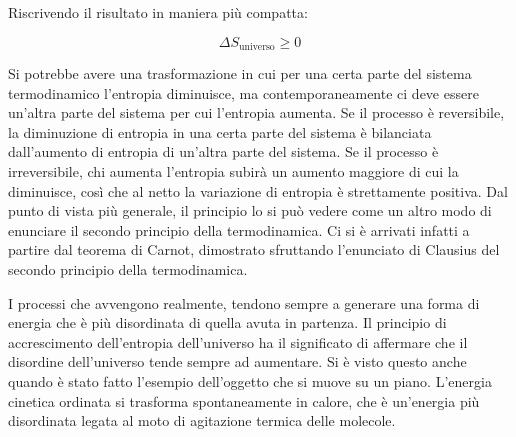 Riscrivendo il risultato in maniera più compatta:

\[
	\boxed{\Delta S_{\text{universo}} \geq 0}
\]

Si potrebbe avere una trasformazione in cui per una certa parte del sistema termodinamico l'entropia diminuisce, ma contemporaneamente ci deve essere un'altra parte del sistema per cui l'entropia aumenta. Se il processo è reversibile, la diminuzione di entropia in una certa parte del sistema è bilanciata dall'aumento di entropia di un'altra parte del sistema. Se il processo è irreversibile, chi aumenta l'entropia subirà un aumento maggiore di cui la diminuisce, così che al netto la variazione di entropia è strettamente positiva. Dal punto di vista più generale, il principio lo si può vedere come un altro modo di enunciare il secondo principio della termodinamica. Ci si è arrivati infatti a partire dal teorema di Carnot, dimostrato sfruttando l'enunciato di Clausius del secondo principio della termodinamica.

I processi che avvengono realmente, tendono sempre a generare una forma di energia che è più disordinata di quella avuta in partenza. Il principio di accrescimento dell'entropia dell'universo ha il significato di affermare che il disordine dell'universo tende sempre ad aumentare. Si è visto questo anche quando è stato fatto l'esempio dell'oggetto che si muove su un piano. L'energia cinetica ordinata si trasforma spontaneamente in calore, che è un'energia più disordinata legata al moto di agitazione termica delle molecole.

